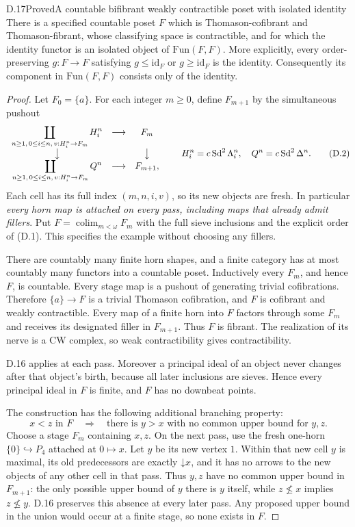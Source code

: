 \begin{claim}{D.17}{Proved}{A countable bifibrant weakly contractible poset with isolated identity}
There is a specified countable poset $F$ which is Thomason-cofibrant and Thomason-fibrant, whose classifying space is contractible, and for which the identity functor is an isolated object of $\mathrm{Fun}(F,F)$. More explicitly, every order-preserving $g:F\to F$ satisfying $g\le\mathrm{id}_F$ or $g\ge\mathrm{id}_F$ is the identity. Consequently its component in $\mathrm{Fun}(F,F)$ consists only of the identity.
\end{claim}
\begin{proof}
Let $F_0=\{a\}$. For each integer $m\ge0$, define $F_{m+1}$ by the simultaneous pushout
\[
\begin{array}{ccc}
\displaystyle\coprod_{n\ge1,\,0\le i\le n,\,v:H_i^n\to F_m} H_i^n
 &\longrightarrow&F_m\\
\big\downarrow&&\big\downarrow\\
\displaystyle\coprod_{n\ge1,\,0\le i\le n,\,v:H_i^n\to F_m} Q^n
 &\longrightarrow&F_{m+1},
\end{array}
\qquad
 H_i^n=c\operatorname{Sd}^2\Lambda_i^n,
 \quad Q^n=c\operatorname{Sd}^2\Delta^n.
\tag{D.2}
\]
Each cell has its full index $(m,n,i,v)$, so its new objects are fresh. In particular \emph{every horn map is attached on every pass, including maps that already admit fillers}. Put $F=\operatorname{colim}_{m<\omega}F_m$ with the full sieve inclusions and the explicit order of (D.1). This specifies the example without choosing any fillers.

There are countably many finite horn shapes, and a finite category has at most countably many functors into a countable poset. Inductively every $F_m$, and hence $F$, is countable. Every stage map is a pushout of generating trivial cofibrations. Therefore $\{a\}\to F$ is a trivial Thomason cofibration, and $F$ is cofibrant and weakly contractible. Every map of a finite horn into $F$ factors through some $F_m$ and receives its designated filler in $F_{m+1}$. Thus $F$ is fibrant. The realization of its nerve is a CW complex, so weak contractibility gives contractibility.

D.16 applies at each pass. Moreover a principal ideal of an object never changes after that object's birth, because all later inclusions are sieves. Hence every principal ideal in $F$ is finite, and $F$ has no downbeat points.

The construction has the following additional branching property:
\[
 x<z\text{ in }F\quad\Longrightarrow\quad
 \text{there is }y>x\text{ with no common upper bound for }y,z.
 \tag{D.3}
\]
Choose a stage $F_m$ containing $x,z$. On the next pass, use the fresh one-horn $\{0\}\hookrightarrow P_4$ attached at $0\mapsto x$. Let $y$ be its new vertex $1$. Within that new cell $y$ is maximal, its old predecessors are exactly $\mathord\downarrow x$, and it has no arrows to the new objects of any other cell in that pass. Thus $y,z$ have no common upper bound in $F_{m+1}$: the only possible upper bound of $y$ there is $y$ itself, while $z\nleq x$ implies $z\nleq y$. D.16 preserves this absence at every later pass. Any proposed upper bound in the union would occur at a finite stage, so none exists in $F$.


\end{proof}
